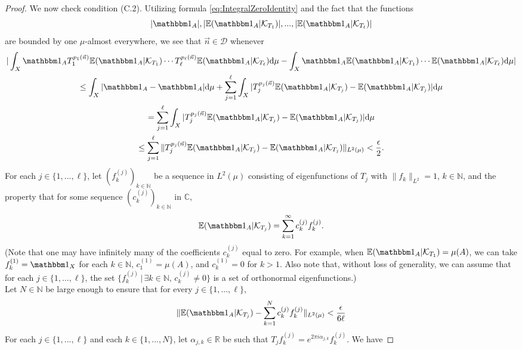 \documentclass[11pt,american,preprint]{elsarticle}
\numberwithin{equation}{section}
\theoremstyle{plain}
\theoremstyle{plain*}
\theoremstyle{plain}
\theoremstyle{plain*}
\theoremstyle{plain}
\theoremstyle{plain*}
\theoremstyle{remark}
\theoremstyle{remark*}
\theoremstyle{remark}
\theoremstyle{remark*}
\theoremstyle{remark}
\theoremstyle{remark*}
\theoremstyle{plain}
\theoremstyle{definition}
\theoremstyle{plain}
\theoremstyle{plain} %
\newcommand{\R}{\mathbb{R}}
\newcommand{\N}{\mathbb{N}}
\newcommand{\C}{\mathbb C}
\begin{document}
\begin{proof}
We now check condition (C.2).
Utilizing formula  \eqref{eq:IntegralZeroIdentity} and the fact that the functions 
$$|\mathbbm 1_A|,|\mathbb E(\mathbbm 1_A|\mathcal K_{T_1})|,...,|\mathbb E(\mathbbm 1_A|\mathcal K_{T_\ell})|$$ are bounded by one  $\mu$-almost everywhere, we see that $\vec n\in\mathcal D$ whenever
\begin{multline}\label{5.eq:BoundIsSumOfBounds}
|\int_X \mathbbm 1_A T_1^{p_1(\vec n)}\mathbb E(\mathbbm 1_A|\mathcal K_{T_1})\cdots T_\ell^{p_
\ell(\vec n)}\mathbb E(\mathbbm 1_A|\mathcal K_{T_\ell})\text{d}\mu
-\int_X \mathbbm 1_A\mathbb E(\mathbbm 1_A|\mathcal K_{T_1})\cdots\mathbb E(\mathbbm 1_A|\mathcal K_{T_\ell})\text{d}\mu|\\
  \leq   \int_X|\mathbbm 1_A-\mathbbm 1_A|\text{d}\mu+\sum_{j=1}^\ell \int_X|T_j^{p_j(\vec n)}\mathbb E(\mathbbm 1_A|\mathcal K_{T_j})-\mathbb E(\mathbbm 1_A|\mathcal K_{T_j})|\text{d}\mu\\
    =\sum_{j=1}^\ell \int_X|T_j^{p_j(\vec n)}\mathbb E(\mathbbm 1_A|\mathcal K_{T_j})-\mathbb E(\mathbbm 1_A|\mathcal K_{T_j})|\text{d}\mu\\
    \leq \sum_{j=1}^\ell \|T_j^{p_j(\vec n)}\mathbb E(\mathbbm 1_A|\mathcal K_{T_j})-\mathbb E(\mathbbm 1_A|\mathcal K_{T_j})\|_{L^2(\mu)}<\frac{\epsilon}{2}.
\end{multline}
    For each $j\in\{1,...,\ell\}$, let $(f_k^{(j)})_{k\in\N}$ be a sequence in $L^2(\mu)$ consisting of  eigenfunctions of $T_j$ with $\|f_k\|_{L^2}=1$, $k\in\N$, and the property that for some sequence $(c_k^{(j)})_{k\in\N}$ in $\C$,
    $$\mathbb E(\mathbbm 1_A|\mathcal K_{T_j})=\sum_{k=1}^\infty c_k^{(j)}f_k^{(j)}.$$
    (Note that one may have infinitely many  of the coefficients $c_k^{(j)}$ equal to zero.  For example, when $\mathbb E(\mathbbm 1_A|\mathcal K_{T_1})=\mu(A)$, we can take $f^{(1)}_k=\mathbbm 1_X$ for each $k\in\N$, $c_1^{(1)}=\mu(A)$, and $c_k^{(1)}=0$ for $k>1$. Also note that, without loss of generality, we can assume that for each $j\in\{1,...,\ell\}$, the set $\{f_k^{(j)}\,|\,\exists k\in\N,\,c_k^{(j)}\neq 0\}$ is a set of orthonormal eigenfunctions.) \\
Let $N\in\N$ be large enough to ensure that for every $j\in\{1,...,\ell\}$,
\begin{equation}\label{5.eq:GoodApproxTruncation}
\|\mathbb E(\mathbbm 1_A|\mathcal K_{T_j})-\sum_{k=1}^N c_k^{(j)}f_k^{(j)}\|_{L^2(\mu)}<
\frac{\epsilon}{6\ell}
\end{equation}
For each $j\in\{1,...,\ell\}$ and each $k\in\{1,...,N\}$, let $\alpha_{j,k}\in \R$ be such that $T_jf_k^{(j)}=e^{2\pi i\alpha_{j,k}}f_k^{(j)}$. We have 

\end{proof}
\end{document}
